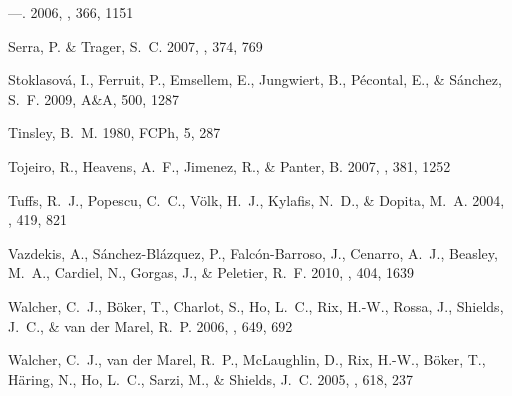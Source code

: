 \begin{thebibliography}
---. 2006{}, \mnras, 366, 1151


{Serra}, P. \& {Trager}, S.~C. 2007, \mnras, 374, 769


Stoklasov{\'a}, I., Ferruit, P., Emsellem, E., Jungwiert, B., P{\'e}contal, E.,
  \& S{\'a}nchez, S.~F. 2009, A\&A, 500, 1287
 \href{http://adsabs.harvard.edu/cgi-bin/nph-data_query?bibcode=2009A\%2526A..%
.500.1287S&link_type=ABSTRACT}{\urllinklabel}

Tinsley, B.~M. 1980, FCPh, 5, 287
 \href{http://adsabs.harvard.edu/cgi-bin/nph-data_query?bibcode=1980FCPh....5.%
.287T&link_type=ABSTRACT}{\urllinklabel}

{Tojeiro}, R., {Heavens}, A.~F., {Jimenez}, R., \& {Panter}, B. 2007, \mnras,
  381, 1252


{Tuffs}, R.~J., {Popescu}, C.~C., {V{\"o}lk}, H.~J., {Kylafis}, N.~D., \&
  {Dopita}, M.~A. 2004, \aap, 419, 821


{Vazdekis}, A., {S{\'a}nchez-Bl{\'a}zquez}, P., {Falc{\'o}n-Barroso}, J.,
  {Cenarro}, A.~J., {Beasley}, M.~A., {Cardiel}, N., {Gorgas}, J., \&
  {Peletier}, R.~F. 2010, \mnras, 404, 1639


{Walcher}, C.~J., {B{\"o}ker}, T., {Charlot}, S., {Ho}, L.~C., {Rix}, H.-W.,
  {Rossa}, J., {Shields}, J.~C., \& {van der Marel}, R.~P. 2006, \apj, 649, 692


{Walcher}, C.~J., {van der Marel}, R.~P., {McLaughlin}, D., {Rix}, H.-W.,
  {B{\"o}ker}, T., {H{\"a}ring}, N., {Ho}, L.~C., {Sarzi}, M., \& {Shields},
  J.~C. 2005, \apj, 618, 237



\end{thebibliography}
